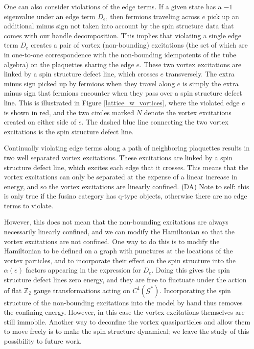 \documentclass[12pt,a4paper]{article}
\newcommand{\mcg}{\mathcal{G}}
\newcommand{\zt}{\mathbb{Z}_2}
\newcommand{\dave}[1]{{\color{ao(english)}\footnotesize{(DA) #1}}}
\begin{document}
One can also consider violations of the edge terms.
If a given state has a $-1$ eigenvalue under an edge term $D_e$, then fermions traveling across $e$ pick up an additional minus sign not taken into account by the spin structure data that comes with our handle decomposition.
This implies that violating a single edge term $D_e$ creates a pair of vortex (non-bounding) excitations (the set of which are in one-to-one correspondence with the non-bounding idempotents of the tube algebra) on the plaquettes sharing the edge $e$. 
These two vortex excitations are linked by a spin structure defect line, which crosses $e$ transversely. 
The extra minus sign picked up by fermions when they travel along $e$ is simply the extra minus sign that fermions encounter when they pass over a spin structure defect line. 
This is illustrated in Figure \ref{lattice_w_vortices}, where the violated edge $e$ is shown in red, and the two circles marked $N$ denote the vortex excitations created on either side of $e$. 
The dashed blue line connecting the two vortex excitations is the spin structure defect line. 

Continually violating edge terms along a path of neighboring plaquettes results in two well separated vortex excitations.
These excitations are linked by a spin structure defect line, which excites each edge that it crosses. 
This means that the vortex excitations can only be separated
at the expense of a linear increase in energy, and so the vortex excitations are linearly confined. 
\dave{Note to self: this is only true if the fusino category has q-type objects, 
otherwise there are no edge terms to violate.}

However, this does not mean that the non-bounding excitations are always necessarily linearly confined, and we can modify the Hamiltonian so that the vortex excitations are not confined.
One way to do this is to modify the Hamiltonian to be defined on a graph with punctures at the locations of the vortex particles, and to incorporate their effect on the spin structure into the $\alpha(e)$ factors appearing in the expression for $D_e$. 
Doing this gives the spin structure defect lines zero energy, and they are free to fluctuate under the action of flat $\zt$ gauge transformations acting on $C^1(\mcg^*)$. 
Incorporating the spin structure of the non-bounding excitations into the model by hand thus removes the confining energy. 
However, in this case the vortex excitations themselves are still immobile. 
Another way to deconfine the vortex quasiparticles and allow them to move freely is to make the spin structure dynamical; we leave the study of this possibility to future work. 
\end{document}
